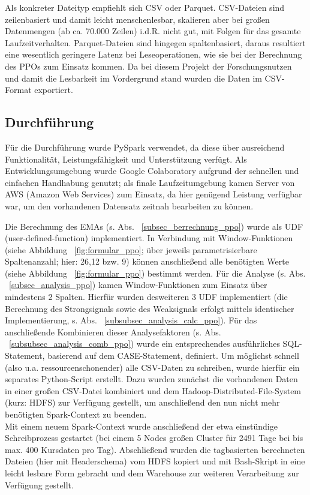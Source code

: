 Als konkreter Dateityp empfiehlt sich CSV oder Parquet. CSV-Dateien sind zeilenbasiert und damit leicht menschenlesbar, skalieren aber bei großen Datenmengen (ab ca. 70.000 Zeilen) i.d.R. nicht gut, mit Folgen für das gesamte Laufzeitverhalten. Parquet-Dateien sind hingegen spaltenbasiert, daraus resultiert eine wesentlich geringere Latenz bei Leseoperationen, wie sie bei der Berechnung des PPOs zum Einsatz kommen. Da bei diesem Projekt der Forschungsnutzen und damit die Lesbarkeit im Vordergrund stand wurden die Daten im CSV-Format exportiert. \cite{medCsvParq,dzCsvParq,wikiCsv,wikiParq}

\subsection{Durchführung}
Für die Durchführung wurde PySpark verwendet, da diese über ausreichend Funktionalität, Leistungsfähigkeit und Unterstützung verfügt. Als Entwicklungsumgebung wurde Google Colaboratory aufgrund der schnellen und einfachen Handhabung genutzt; als finale Laufzeitumgebung kamen Server von AWS (Amazon Web Services) zum Einsatz, da hier genügend Leistung verfügbar war, um den vorhandenen Datensatz zeitnah bearbeiten zu können.

Die Berechnung des EMAs (s. Abs. ~\ref{subsec_berrechnung_ppo}) wurde als UDF (user-defined-function) implementiert. In Verbindung mit Window-Funk\-tionen (siehe Abbildung ~\ref{fig:formular_ppo}; über jeweils parametrisierbare Spaltenanzahl; hier: 26,12 bzw. 9) können anschließend alle benötigten Werte (siehe Abbildung ~\ref{fig:formular_ppo}) bestimmt werden.
Für die Analyse (s. Abs. ~\ref{subsec_analysis_ppo}) kamen Window-Funktionen zum Einsatz über mindestens 2 Spalten. Hierfür wurden desweiteren 3 UDF implementiert (die Berechnung des Strongsignals sowie des Weaksignals erfolgt mittels identischer Implementierung, s. Abs. ~\ref{subsubsec_analysis_calc_ppo}). Für das anschließende Kombinieren dieser Analysefaktoren (s. Abs. ~\ref{subsubsec_analysis_comb_ppo}) wurde ein entsprechendes ausführliches SQL-Statement, basierend auf dem CASE-Statement, definiert.
Um möglichst schnell (also u.a. ressourcenschonender) alle CSV-Daten zu schreiben, wurde hierfür ein separates Python-Script erstellt. Dazu wurden zunächst die vorhandenen Daten in einer großen CSV-Datei kombiniert und dem Hadoop-Distributed-File-System (kurz: HDFS) zur Verfügung gestellt, um anschließend den nun nicht mehr benötigten Spark-Context zu beenden. \\
%
Mit einem neuem Spark-Context wurde anschließend der etwa einstündige Schreibprozess gestartet (bei einem 5 Nodes großen Cluster für 2491 Tage bei bis max. 400 Kursdaten pro Tag). Abschließend wurden die tagbasierten berechneten Dateien (hier mit Headerschema) vom HDFS kopiert und mit Bash-Skript in eine leicht lesbare Form gebracht und dem Warehouse zur weiteren Verarbeitung zur Verfügung gestellt. 


